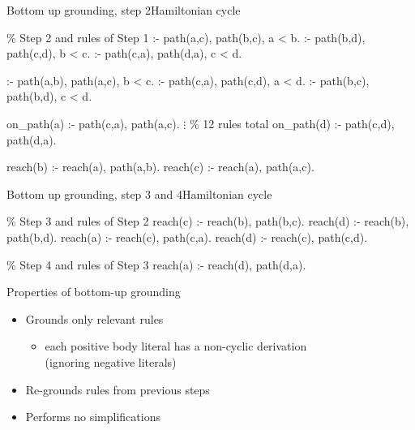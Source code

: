 \begin{frame}{Bottom up grounding, step 2}{Hamiltonian cycle}
\begin{SemiVerbatim}[\small]{.9}
{\color{comment}\% Step 2 \alert{and} rules of Step 1}
:- \alert{path(a,c)}, \alert{path(b,c)}, a < b.
:- \alert{path(b,d)}, \alert{path(c,d)}, b < c.
:- \alert{path(c,a)}, \alert{path(d,a)}, c < d.

:- \alert{path(a,b)}, \alert{path(a,c)}, b < c.
:- \alert{path(c,a)}, \alert{path(c,d)}, a < d.
:- \alert{path(b,c)}, \alert{path(b,d)}, c < d.

on_path(a) :- \alert{path(c,a)}, \alert{path(a,c)}.
           \(\vdots\) {\color{comment}\% 12 rules total}
on_path(d) :- \alert{path(c,d)}, \alert{path(d,a)}.

reach(b) :- \alert{reach(a)}, \alert{path(a,b)}.
reach(c) :- \alert{reach(a)}, \alert{path(a,c)}.
\end{SemiVerbatim}
\end{frame}
\begin{frame}{Bottom up grounding, step 3 and 4}{Hamiltonian cycle}
  \bigskip
\begin{SemiVerbatim}{.9}
{\color{comment}\% Step 3 \alert{and} rules of Step 2}
reach(c) :- \alert{reach(b)}, path(b,c).
reach(d) :- \alert{reach(b)}, path(b,d).
reach(a) :- \alert{reach(c)}, path(c,a).
reach(d) :- \alert{reach(c)}, path(c,d).

{\color{comment}\% Step 4 \alert{and} rules of Step 3}
reach(a) :- \alert{reach(d)}, path(d,a).
\end{SemiVerbatim}
\end{frame}
\begin{frame}{Properties of bottom-up grounding}
  \bigskip
  \begin{itemize}
  \item Grounds only \alert{relevant} rules
    \begin{itemize}\normalsize
    \item each positive body literal has a non-cyclic derivation \\
      (ignoring negative literals)
    \end{itemize}
    \smallskip
  \item \alert{Re-grounds} rules from previous steps
    \medskip
  \item Performs no \alert{simplifications}
  \end{itemize}
\end{frame}
